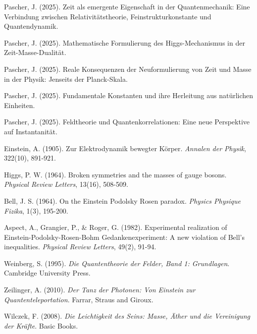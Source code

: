 \documentclass{article}
\theoremstyle{definition}
\theoremstyle{remark}
\begin{document}
	\begin{thebibliography}{99}
	 Pascher, J. (2025). Zeit als emergente Eigenschaft in der Quantenmechanik: Eine Verbindung zwischen Relativitätstheorie, Feinstrukturkonstante und Quantendynamik.
	
	 Pascher, J. (2025). Mathematische Formulierung des Higgs-Mechanismus in der Zeit-Masse-Dualität.
	
	 Pascher, J. (2025). Reale Konsequenzen der Neuformulierung von Zeit und Masse in der Physik: Jenseits der Planck-Skala.
	
	 Pascher, J. (2025). Fundamentale Konstanten und ihre Herleitung aus natürlichen Einheiten.
	
	 Pascher, J. (2025). Feldtheorie und Quantenkorrelationen: Eine neue Perspektive auf Instantanität.
	
	 Einstein, A. (1905). Zur Elektrodynamik bewegter Körper. \textit{Annalen der Physik}, 322(10), 891-921.
	
	 Higgs, P. W. (1964). Broken symmetries and the masses of gauge bosons. \textit{Physical Review Letters}, 13(16), 508-509.
	
	 Bell, J. S. (1964). On the Einstein Podolsky Rosen paradox. \textit{Physics Physique Fizika}, 1(3), 195-200.
	
	 Aspect, A., Grangier, P., \& Roger, G. (1982). Experimental realization of Einstein-Podolsky-Rosen-Bohm Gedankenexperiment: A new violation of Bell's inequalities. \textit{Physical Review Letters}, 49(2), 91-94.
	
	 Weinberg, S. (1995). \textit{Die Quantentheorie der Felder, Band 1: Grundlagen}. Cambridge University Press.
	
	 Zeilinger, A. (2010). \textit{Der Tanz der Photonen: Von Einstein zur Quantenteleportation}. Farrar, Straus and Giroux.
	
	 Wilczek, F. (2008). \textit{Die Leichtigkeit des Seins: Masse, Äther und die Vereinigung der Kräfte}. Basic Books.
	\end{thebibliography}
	
\end{document}
